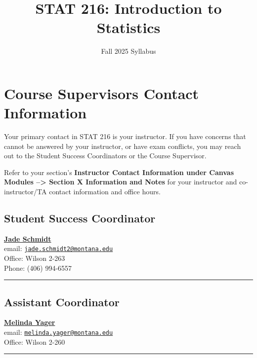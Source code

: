 \documentclass[
]{article}
\title{STAT 216: Introduction to Statistics}
\author{Fall 2025 Syllabus}
\date{}
\begin{document}
\maketitle

{
\setcounter{tocdepth}{3}
\tableofcontents
}
\section{Course Supervisors Contact
Information}\label{course-supervisors-contact-information}

Your primary contact in STAT 216 is your instructor. If you have
concerns that cannot be answered by your instructor, or have exam
conflicts, you may reach out to the Student Success Coordinators or the
Course Supervisor.

Refer to your section's \textbf{Instructor Contact Information under
Canvas Modules --\textgreater{} Section X Information and Notes} for
your instructor and co-instructor/TA contact information and office
hours.

\subsection{Student Success
Coordinator}\label{student-success-coordinator}

\href{http://www.math.montana.edu/directory/faculty/1524571/jade-schmidt}{\textbf{Jade
Schmidt}}\\
email:
\href{mailto:jade.schmidt2@montana.edu}{\nolinkurl{jade.schmidt2@montana.edu}}\\
Office: Wilson 2-263\\
Phone: (406) 994-6557

\begin{center}\rule{0.5\linewidth}{0.5pt}\end{center}

\subsection{Assistant Coordinator}\label{assistant-coordinator}

\href{http://www.math.montana.edu/directory/faculty/1582830/melinda-yager}{\textbf{Melinda
Yager}}\\
email:
\href{mailto:melinda.yager@montana.edu}{\nolinkurl{melinda.yager@montana.edu}}\\
Office: Wilson 2-260

\begin{center}\rule{0.5\linewidth}{0.5pt}\end{center}
\end{document}
